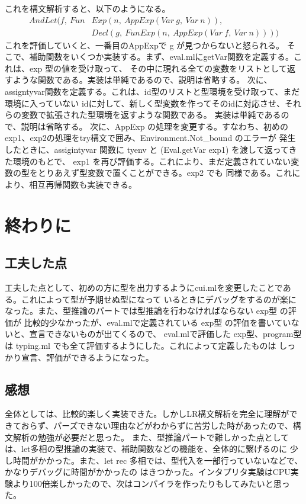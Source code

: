 \documentclass{jreport}
\begin{document}
これを構文解析すると、以下のようになる。
\begin{equation}
  \begin{split}
    AndLet(f, \ Fun&Exp(n, \ AppExp(Var \ g, \ Var \ n)), \\ &Decl(g, \ FunExp(n, \ AppExp(Var \ f, \ Var \ n))))
  \end{split}
\end{equation}
これを評価していくと、一番目のAppExpで g が見つからないと怒られる。
そこで、補助関数をいくつか実装する。まず、eval.mlにgetVar関数を定義する。これは、exp 型の値を受け取って、
その中に現れる全ての変数をリストとして返すような関数である。実装は単純であるので、説明は省略する。
次に、assigntyvar関数を定義する。これは、id型のリストと型環境を受け取って、まだ環境に入っていない
idに対して、新しく型変数を作ってそのidに対応させ、それらの変数で拡張された型環境を返すような関数である。
実装は単純であるので、説明は省略する。
次に、AppExp の処理を変更する。すなわち、初めのexp1、exp2の処理をtry構文で囲み、Environment.Not\_bound のエラーが
発生したときに、assigintyvar 関数に tyenv と (Eval.getVar exp1) を渡して返ってきた環境のもとで、
exp1 を再び評価する。これにより、まだ定義されていない変数の型をとりあえず型変数で置くことができる。exp2 でも
同様である。これにより、相互再帰関数も実装できる。
\chapter{終わりに}
\section{工夫した点}
工夫した点として、初めの方に型を出力するようにcui.mlを変更したことである。これによって型が予期せぬ型になって
いるときにデバッグをするのが楽になった。また、型推論のパートでは型推論を行わなければならない exp型 の評価が
比較的少なかったが、eval.mlで定義されている exp型 の評価を書いていないと、宣言できないものが出てくるので、
eval.mlで評価した exp型、program型は typing.ml でも全て評価するようにした。これによって定義したものは
しっかり宣言、評価ができるようになった。
\section{感想}
全体としては、比較的楽しく実装できた。しかしLR構文解析を完全に理解ができておらず、パーズできない理由などがわからずに苦労した時があったので、構文解析の勉強が必要だと思った。
また、型推論パートで難しかった点としては、let多相の型推論の実装で、補助関数などの機能を、全体的に繋げるのに
少し時間がかかった。また、let rec 多相では、型代入を一部行っていないなどで、かなりデバッグに時間がかかったの
はきつかった。インタプリタ実験はCPU実験より100倍楽しかったので、次はコンパイラを作ったりもしてみたいと思った。
\end{document}
